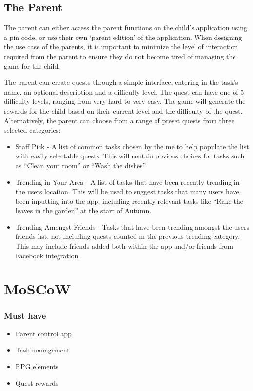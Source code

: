 \subsection{The Parent}
The parent can either access the parent functions on the child's application using a pin code, or use their own `parent edition' of the application. 
When designing the use case of the parents, it is important to minimize the level of interaction required from the parent to ensure they do not become tired of managing the game for the child.

The parent can create quests through a simple interface, entering in the task's name, an optional description and a difficulty level. 
The quest can have one of 5 difficulty levels, ranging from very hard to very easy.
The game will generate the rewards for the child based on their current level and the difficulty of the quest.
Alternatively, the parent can choose from a range of preset quests from three selected categories:
\begin{itemize}
	\item 
		Staff Pick - A list of common tasks chosen by the me to help populate the list with easily selectable quests. 
		This will contain obvious choices for tasks such as ``Clean your room'' or ``Wash the dishes''
	\item
		Trending in Your Area - A list of tasks that have been recently trending in the users location. 
		This will be used to suggest tasks that many users have been inputting into the app, including recently relevant tasks like ``Rake the leaves in the garden'' at the start of Autumn.
	\item 
		Trending Amongst Friends - Tasks that have been trending amongst the users friends list, not including quests counted in the previous 	trending category. 
		This may include friends added both within the app and/or friends from Facebook integration.  
\end{itemize}

\section{MoSCoW}

\subsubsection{Must have}
\begin{itemize}
	\item Parent control app
	\item Task management
	\item RPG elements
	\item Quest rewards
\end{itemize}


